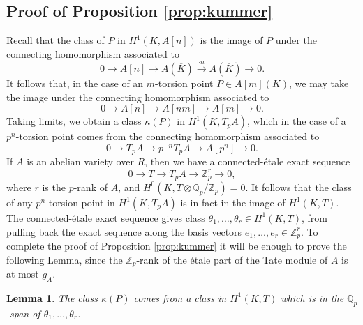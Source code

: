 \documentclass[11pt]{amsart}
\def\Z{\mathbb Z}
\def\Q{\mathbb Q}
\theoremstyle{plain}
\newtheorem{lemma}{Lemma}
\theoremstyle{definition}
\begin{document}
\subsection{Proof of Proposition \ref{prop:kummer}}
Recall that the class of $P$ in $H^1 (K,A[n])$ is the image of $P$ under the connecting homomorphism associated to
\[
0\to A[n]\to A(\overline{K})\stackrel{\cdot n}{\longrightarrow }A(\overline{K})\to 0.
\]
It follows that, in the case of an $m$-torsion point $P\in A[m](K)$, we may take the image under the connecting homomorphism associated to 
\[
0\to A[n]\to A[nm]\to A[m]\to 0.
\]
Taking limits, we obtain a class $\kappa (P)$ in $H^1 (K,T_p A)$, which in the case of a $p^n$-torsion point comes from the connecting homomorphism associated to
\[
0\to T_p A \to p^{-n}T_p A\to A[p^n ]\to 0.
\]
If $A$ is an abelian variety over $R$, then we have a connected-\'etale exact sequence
\[
0\to T\to T_p A \to \Z _p ^{r} \to 0,
\]
where $r$ is the $p$-rank of $A$, and $H^0 (K,T\otimes \Q _p /\Z _p )=0$. It follows that the class of any $p^n$-torsion point in $H^1 (K,T_p A)$ is in fact in the image of $H^1 (K,T)$. The connected-\'etale exact sequence gives class $\theta _1 ,\ldots ,\theta _r  \in H^1 (K,T)$, from pulling back the exact sequence along the basis vectors $e_1 ,\ldots ,e_r \in \Z _p ^r$. To complete the proof of Proposition \ref{prop:kummer} it will be enough to prove the following Lemma, since the $\Z _p$-rank of the \'etale part of the Tate module of $A$ is at most $g_A$.
\begin{lemma}
The class $\kappa (P)$ comes from a class in $H^1 (K,T)$ which is in the $\Q _p $-span of $\theta _1 ,\ldots ,\theta _r $.
\end{lemma}
\end{document}
